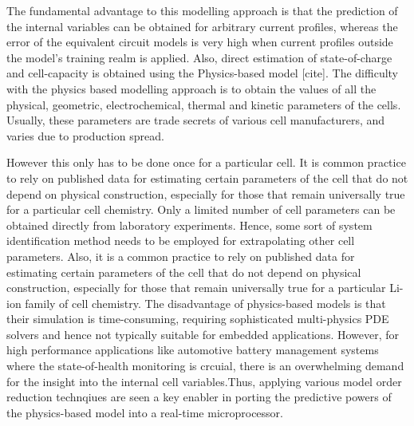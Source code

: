 The fundamental advantage
to this modelling approach is that the prediction of the internal
variables can be obtained for arbitrary current profiles, whereas
the error of the equivalent circuit models is very high when current
profiles outside the model\textquoteright s training realm is applied.
Also, direct estimation of state-of-charge and cell-capacity is obtained
using the Physics-based model {[}cite{]}. The difficulty with the
physics based modelling approach is to obtain the values of all the
physical, geometric, electrochemical, thermal and kinetic parameters
of the cells. Usually, these parameters are trade secrets of various
cell manufacturers, and varies due to production spread.

However this only has to be done once for a particular cell. It is
common practice to rely on published data for estimating certain parameters
of the cell that do not depend on physical construction, especially
for those that remain universally true for a particular cell chemistry.
Only a limited
number of cell parameters can be obtained directly from laboratory
experiments. Hence, some sort of system identification method needs
to be employed for extrapolating other cell parameters. Also, it is
a common practice to rely on published data for estimating certain
parameters of the cell that do not depend on physical construction,
especially for those that remain universally true for a particular
Li-ion family of cell chemistry. The disadvantage of physics-based
models is that their simulation is time-consuming, requiring sophisticated
multi-physics PDE solvers and hence not typically suitable for embedded
applications. However, for high performance applications like automotive
battery management systems where the state-of-health monitoring is
crcuial, there is an overwhelming demand for the insight into the
internal cell variables.Thus, applying various model order reduction
technqiues are seen a key enabler in porting the predictive powers
of the physics-based model into a real-time microprocessor.

